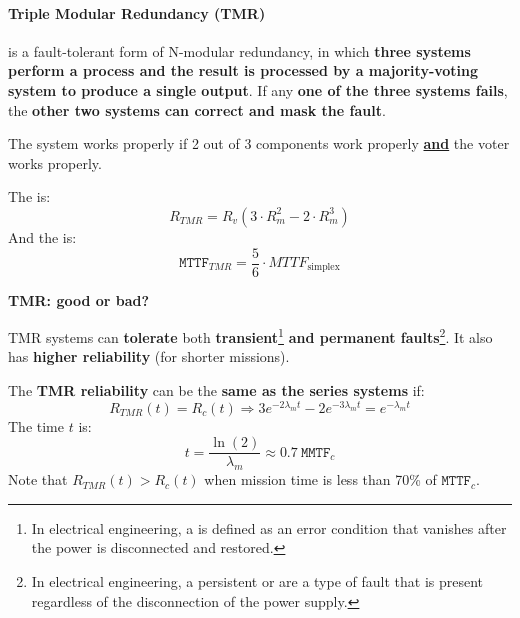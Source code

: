 \newpage

\paragraph{Triple Modular Redundancy (TMR)}

 is a fault-tolerant form of N-modular redundancy, in which \textbf{three systems perform a process and the result is processed by a majority-voting system to produce a single output}. If any \textbf{one of the three systems fails}, the \textbf{other two systems can correct and mask the fault}.

\highspace
The system works properly if 2 out of 3 components work properly \textbf{\underline{and}} the voter works properly.

\highspace
The  is:
\begin{equation}
	R_{TMR} = R_{v}\left(3 \cdot R_{m}^{2} - 2 \cdot R_{m}^{3}\right)
\end{equation}
And the  is:
\begin{equation}
	\texttt{MTTF}_{TMR} = \dfrac{5}{6} \cdot MTTF_{\text{simplex}}
\end{equation}

\begin{flushleft}
	\textcolor{Green3}{ \textbf{TMR: good or bad?}}
\end{flushleft}
TMR systems can \textbf{tolerate} both \textbf{transient}\footnote{In electrical engineering, a  is defined as an error condition that vanishes after the power is disconnected and restored.} \textbf{and permanent faults}\footnote{In electrical engineering, a persistent or  are a type of fault that is present regardless of the disconnection of the power supply.}. It also has \textbf{higher reliability} (for shorter missions).

\highspace
The \textbf{TMR reliability} can be the \textbf{same as the series systems} if:
\begin{equation}
	R_{TMR}\left(t\right) = R_{c}\left(t\right) \Longrightarrow 3e^{-2 \lambda_{m} t} - 2e^{-3 \lambda_{m} t} = e^{-\lambda_{m} t}
\end{equation}
The time $t$ is:
\begin{equation}
	t = \dfrac{\ln\left(2\right)}{\lambda_{m}} \approx 0.7 \: \texttt{MMTF}_{c}
\end{equation}
Note that $R_{TMR}\left(t\right) > R_{c}\left(t\right)$ when mission time is less than 70\% of $\texttt{MTTF}_{c}$.
